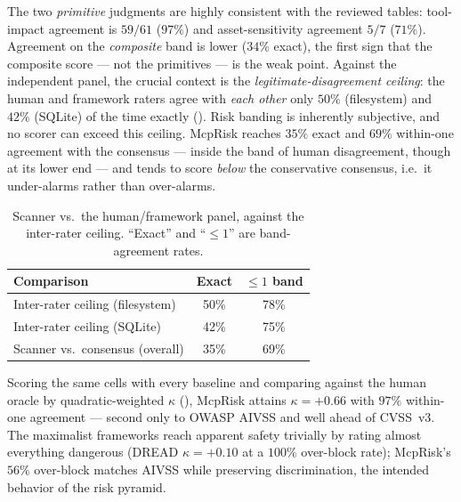 The two \emph{primitive} judgments are highly consistent with the reviewed
tables: tool-impact agreement is $59/61$ ($97\%$) and asset-sensitivity
agreement $5/7$ ($71\%$). Agreement on the \emph{composite} band is lower ($34\%$
exact), the first sign that the composite score --- not the primitives --- is the
weak point. Against the independent panel, the crucial context is the
\emph{legitimate-disagreement ceiling}: the human and framework raters agree with
\emph{each other} only $50\%$ (filesystem) and $42\%$ (SQLite) of the time
exactly (). Risk banding is inherently subjective, and no scorer
can exceed this ceiling. McpRisk reaches $35\%$ exact and $69\%$ within-one
agreement with the consensus --- inside the band of human disagreement, though at
its lower end --- and tends to score \emph{below} the conservative consensus,
i.e.\ it under-alarms rather than over-alarms.

\begin{table}[H]
    \centering
    \caption{Scanner vs.\ the human/framework panel, against the inter-rater
    ceiling. ``Exact'' and ``$\le 1$'' are band-agreement rates.}
    \label{tab:human}
    \begin{tabular}{l c c}
        \hline
        \textbf{Comparison} & \textbf{Exact} & \textbf{$\le 1$ band} \\
        \hline
        Inter-rater ceiling (filesystem) & 50\% & 78\% \\
        Inter-rater ceiling (SQLite)     & 42\% & 75\% \\
        Scanner vs.\ consensus (overall) & 35\% & 69\% \\
        \hline
    \end{tabular}
\end{table}

Scoring the same cells with every baseline and comparing against the human oracle
by quadratic-weighted $\kappa$ (), McpRisk attains
$\kappa=+0.66$ with $97\%$ within-one agreement --- second only to OWASP AIVSS
and well ahead of CVSS~v3. The maximalist frameworks reach apparent safety
trivially by rating almost everything dangerous (DREAD $\kappa=+0.10$ at a
$100\%$ over-block rate); McpRisk's $56\%$ over-block matches AIVSS while
preserving discrimination, the intended behavior of the risk pyramid.

